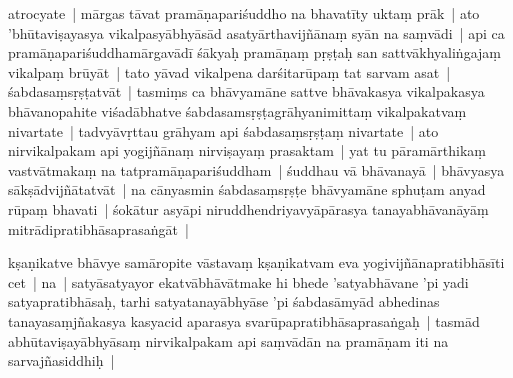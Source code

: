 \documentclass[article,12pt,a4paper]{memoir}%
\newcounter{parCount}
\begin{document}
	  
	  \pstart \leavevmode%
	\label{thakur75-14.22}atrocyate | mārgas tāvat pramāṇapariśuddho na bhavatīty uktaṃ prāk | ato 'bhūtaviṣayasya vikalpasyābhyāsād asatyārthavijñānaṃ syān na saṃvādi | api ca pramāṇapariśuddhamārgavādī śākyaḥ pramāṇaṃ pṛṣṭaḥ san sattvākhyaliṅgajaṃ vikalpaṃ brūyāt | tato yāvad vikalpena darśitarūpaṃ tat sarvam asat | śabdasaṃsṛṣṭatvāt | tasmiṃs ca bhāvyamāne sattve bhāvakasya vikalpakasya bhāvanopahite viśadābhatve śabdasamsṛṣṭagrāhyanimittaṃ vikalpakatvaṃ nivartate | tadvyāvṛttau grāhyam api śabdasaṃsṛṣṭaṃ nivartate | ato nirvikalpakam api yogijñānaṃ nirviṣayaṃ prasaktam | yat tu pāramārthikaṃ vastvātmakaṃ na tatpramāṇapariśuddham | śuddhau vā bhāvanayā | bhāvyasya sākṣādvijñātatvāt | na cānyasmin śabdasaṃsṛṣṭe bhāvyamāne sphuṭam anyad rūpaṃ bhavati | śokātur asyāpi niruddhendriyavyāpārasya tanayabhāvanāyāṃ mitrādipratibhāsaprasaṅgāt | 
	{}
	\pend%
      

	  
	  \pstart \leavevmode%
	\label{thakur75-15.4}kṣaṇikatve bhāvye samāropite vāstavaṃ kṣaṇikatvam eva yogivijñānapratibhāsīti cet | na | satyāsatyayor ekatvābhāvātmake hi bhede 'satyabhāvane 'pi yadi satyapratibhāsaḥ, tarhi satyatanayābhyāse 'pi śabdasāmyād abhedinas tanayasaṃjñakasya kasyacid aparasya svarūpapratibhāsaprasaṅgaḥ | tasmād abhūtaviṣayābhyāsaṃ nirvikalpakam api saṃvādān na pramāṇam iti na sarvajñasiddhiḥ | 
	{}
	\pend%
      
\end{document}
